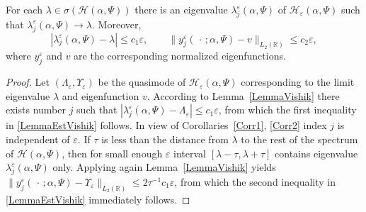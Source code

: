 \documentclass[11pt,english]{amsart}
\begin{document}
\begin{g_lemma}\label{LemmaQuasimodes}
For each $\lambda\in \sigma(\mathcal{H}(\alpha,\Psi))$ there is an eigenvalue $\lambda_j^\varepsilon(\alpha, \Psi)$ of $\mathcal{H}_{\varepsilon}(\alpha,\Psi)$ such that $\lambda_j^\varepsilon(\alpha, \Psi)\to \lambda$. Moreover,
  \begin{equation}\label{LemmaEstVishik}
 {\left\vert{\lambda_j^\varepsilon(\alpha, \Psi)-\lambda}\right\vert}\leq c_1\varepsilon,\qquad
 \bigl\|y_j^{\varepsilon}(\,\cdot\,;\alpha, \Psi)-v\bigr\|_{L_2(\mathbb{R})}\leq c_2\varepsilon,
\end{equation}
where $y_j^{\varepsilon}$ and $v$ are the corresponding normalized eigenfunctions.
\end{g_lemma}
\begin{proof} Let $(\Lambda_\varepsilon, \Upsilon_\varepsilon)$ be the quasimode of $\mathcal{H}_{\varepsilon}(\alpha,\Psi)$ corresponding to the limit eigenvalue $\lambda$ and eigenfunction $v$. According to Lemma~\ref{LemmaVishik} there exists number $j$ such that ${\left\vert{\lambda_j^\varepsilon(\alpha, \Psi)-\Lambda_\varepsilon}\right\vert}\leq c_1\varepsilon$, from which  the first inequality in \eqref{LemmaEstVishik} follows.
In view of Corollaries~\ref{Corr1}, \ref{Corr2}  index
$j$ is independent of $\varepsilon$. If $\tau$ is less than the distance from $\lambda$ to the rest of the spectrum of $\mathcal{H}(\alpha,\Psi)$, then  for small enough $\varepsilon$ interval $[\lambda-\tau,\lambda+\tau]$  contains eigenvalue $\lambda_j^\varepsilon(\alpha, \Psi)$ only. Applying again Lemma~\ref{LemmaVishik} yields
  $\bigl\|y_j^{\varepsilon}(\,\cdot\,;\alpha, \Psi)-\Upsilon_\varepsilon\bigr\|_{L_2(\mathbb{R})}\leq 2\tau^{-1}c_1\varepsilon$, from which  the second inequality in \eqref{LemmaEstVishik} immediately follows.
\end{proof}
\end{document}
